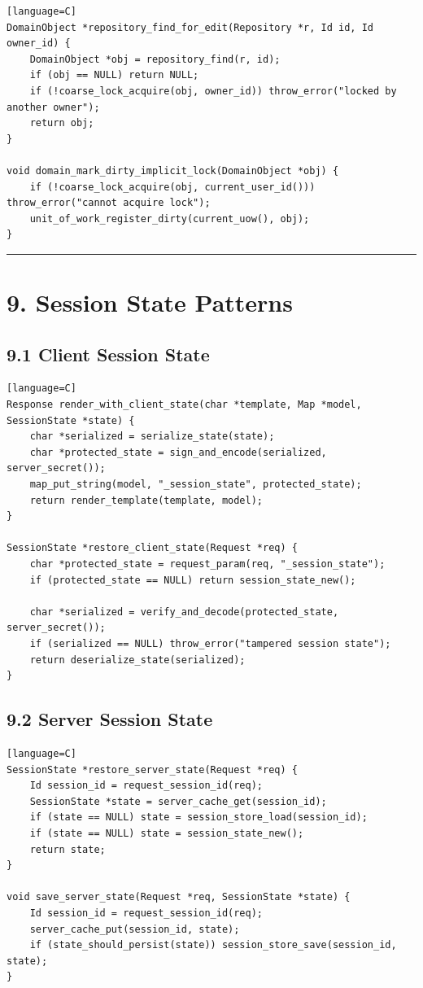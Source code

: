 \documentclass[11pt]{article}
\begin{document}
\begin{verbatim}[language=C]
DomainObject *repository_find_for_edit(Repository *r, Id id, Id owner_id) {
    DomainObject *obj = repository_find(r, id);
    if (obj == NULL) return NULL;
    if (!coarse_lock_acquire(obj, owner_id)) throw_error("locked by another owner");
    return obj;
}

void domain_mark_dirty_implicit_lock(DomainObject *obj) {
    if (!coarse_lock_acquire(obj, current_user_id())) throw_error("cannot acquire lock");
    unit_of_work_register_dirty(current_uow(), obj);
}
\end{verbatim}

\begin{center}\rule{0.5\linewidth}{0.5pt}\end{center}

\section{9. Session State Patterns}\label{session-state-patterns}

\subsection{9.1 Client Session State}\label{client-session-state}

\begin{verbatim}[language=C]
Response render_with_client_state(char *template, Map *model, SessionState *state) {
    char *serialized = serialize_state(state);
    char *protected_state = sign_and_encode(serialized, server_secret());
    map_put_string(model, "_session_state", protected_state);
    return render_template(template, model);
}

SessionState *restore_client_state(Request *req) {
    char *protected_state = request_param(req, "_session_state");
    if (protected_state == NULL) return session_state_new();

    char *serialized = verify_and_decode(protected_state, server_secret());
    if (serialized == NULL) throw_error("tampered session state");
    return deserialize_state(serialized);
}
\end{verbatim}

\subsection{9.2 Server Session State}\label{server-session-state}

\begin{verbatim}[language=C]
SessionState *restore_server_state(Request *req) {
    Id session_id = request_session_id(req);
    SessionState *state = server_cache_get(session_id);
    if (state == NULL) state = session_store_load(session_id);
    if (state == NULL) state = session_state_new();
    return state;
}

void save_server_state(Request *req, SessionState *state) {
    Id session_id = request_session_id(req);
    server_cache_put(session_id, state);
    if (state_should_persist(state)) session_store_save(session_id, state);
}
\end{verbatim}
\end{document}
